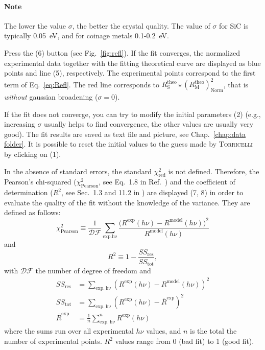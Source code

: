 \documentclass[oldfontcommands,openany,oneside]{memoir}
\begin{document}
\paragraph{Note} The lower the value $\sigma$, the better the crystal quality. The value of $\sigma$ for SiC is typically 0.05~eV, and for coinage metals 0.1-0.2~eV.


Press the  (6) button (see Fig.~\ref{fig:refl}). If the fit converges, the normalized experimental data together with the fitting theoretical curve are displayed as blue points and line (5), respectively. The experimental points correspond to the first term of Eq.~\ref{eq:Refl}. The red line corresponds to $R^\mathrm{theo}_\mathrm{S} \star \left(R^\mathrm{theo}_\mathrm{M}\right)^2_\mathrm{Norm}$, that is \emph{without} gaussian broadening ($\sigma=0$).

If the fit does not converge, you can try to modify the initial parameters (2) (e.g., increasing $\underline{\sigma}$ usually helps to find convergence, the other values are usually very good). The fit results are saved as text file and picture, see Chap.~\ref{chap:data folder}. It is possible to reset the initial values to the guess made by \textsc{Torricelli} by clicking on  (1). 


In the absence of standard errors, the standard $\chi_\mathrm{red}^2$ is not defined. Therefore, the Pearson's chi-squared ($\chi_\mathrm{Pearson}^2$, see Eq.~1.8 in Ref.~\cite{GreenwoodBook}) and the coefficient of determination ($R^2$, see Sec.~1.3 and 11.2 in \cite{DrapperSmith}) are displayed (7, 8) in order to evaluate the quality of the fit \cite{GlantzSlinker, DrapperSmith} without the knowledge of the variance. They are defined as follows:
\begin{equation*}
\chi_\mathrm{Pearson}^2 \equiv \frac{1}{\mathcal{DF}}\sum_\mathrm{exp. h\nu} \frac{\Big(R^\mathrm{exp}(h\nu) - R^\mathrm{model}(h\nu)\Big)^2}{R^\mathrm{model}(h\nu)}
\end{equation*}
and
\begin{equation}
  R^2\equiv 1 - \frac{SS_\mathrm{res}}{SS_\mathrm{tot}},
\end{equation}
with $\mathcal{DF}$ the number of degree of freedom and
\begin{align}
  SS_\mathrm{res} &= \sum_\mathrm{exp.~h\nu} \left(R^\mathrm{exp} (h\nu) - R^\mathrm{model} (h\nu)\right)^2 \\
  SS_\mathrm{tot} &=\sum_\mathrm{exp.~h\nu} \left(R^\mathrm{exp} (h\nu) - \bar R^\mathrm{exp} \right)^2\\
  \bar R^\mathrm{exp}&=\frac{1}{n} \sum_\mathrm{exp.~h\nu}^n R^\mathrm{exp} (h\nu)
\end{align}
where the sums run over all experimental $h\nu$ values, and $n$ is the total the number of experimental points. $R^2$ values range from 0 (bad fit) to 1 (good fit).
\end{document}
